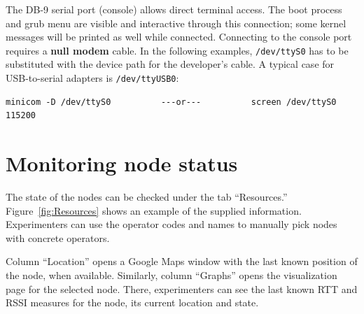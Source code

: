 \documentclass[a4paper,10pt]{article}
\newcommand{\identifier}[1]{{\texttt{\small{#1}}}}
\begin{document}
The DB-9 serial port (console) allows direct terminal access.
The boot process and grub menu are visible and interactive through this connection; some kernel messages will be printed as well while connected.
Connecting to the console port requires a \textbf{null modem} cable.
In the following examples, \identifier{/dev/ttyS0} has to be substituted with the device path for the developer's cable.
A typical case for USB-to-serial adapters is \identifier{/dev/ttyUSB0}:
\begin{verbatim}
minicom -D /dev/ttyS0          ---or---          screen /dev/ttyS0 115200
\end{verbatim}



\section{Monitoring node status}
\label{subsec:nodeStatus}

The state of the nodes can be checked under the tab ``Resources.''
Figure~\ref{fig:Resources} shows an example of the supplied information.
Experimenters can use the operator codes and names to manually pick nodes with concrete operators.

Column ``Location'' opens a Google Maps window with the last known position of the node, when available.
Similarly, column ``Graphs'' opens the visualization page for the selected node.
There, experimenters can see the last known RTT and RSSI measures for the node, its current location and state.
\end{document}
